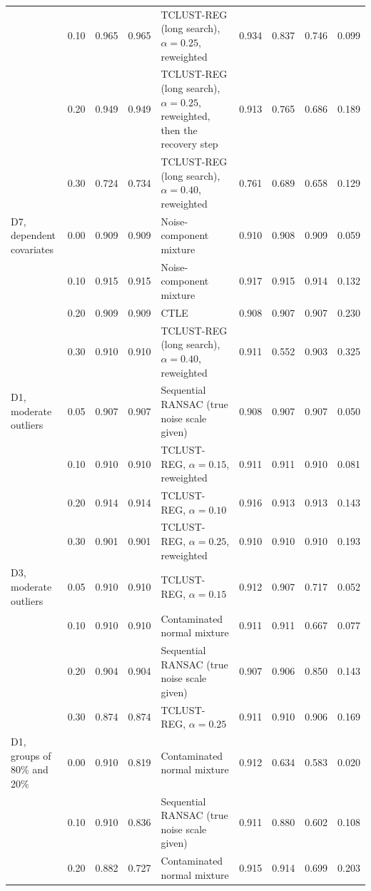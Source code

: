 \begin{table}[htbp]
{\begin{tabular}{lccclcccc}
 & 0.10 & 0.965 & 0.965 & TCLUST-REG (long search), $\alpha=0.25$, reweighted & 0.934 & 0.837 & 0.746 & 0.099 \\
 & 0.20 & 0.949 & 0.949 & TCLUST-REG (long search), $\alpha=0.25$, reweighted, then the recovery step & 0.913 & 0.765 & 0.686 & 0.189 \\
 & 0.30 & 0.724 & 0.734 & TCLUST-REG (long search), $\alpha=0.40$, reweighted & 0.761 & 0.689 & 0.658 & 0.129 \\
\addlinespace
D7, dependent covariates & 0.00 & 0.909 & 0.909 & Noise-component mixture & 0.910 & 0.908 & 0.909 & 0.059 \\
 & 0.10 & 0.915 & 0.915 & Noise-component mixture & 0.917 & 0.915 & 0.914 & 0.132 \\
 & 0.20 & 0.909 & 0.909 & CTLE & 0.908 & 0.907 & 0.907 & 0.230 \\
 & 0.30 & 0.910 & 0.910 & TCLUST-REG (long search), $\alpha=0.40$, reweighted & 0.911 & 0.552 & 0.903 & 0.325 \\
\addlinespace
D1, moderate outliers & 0.05 & 0.907 & 0.907 & Sequential RANSAC (true noise scale given) & 0.908 & 0.907 & 0.907 & 0.050 \\
 & 0.10 & 0.910 & 0.910 & TCLUST-REG, $\alpha=0.15$, reweighted & 0.911 & 0.911 & 0.910 & 0.081 \\
 & 0.20 & 0.914 & 0.914 & TCLUST-REG, $\alpha=0.10$ & 0.916 & 0.913 & 0.913 & 0.143 \\
 & 0.30 & 0.901 & 0.901 & TCLUST-REG, $\alpha=0.25$, reweighted & 0.910 & 0.910 & 0.910 & 0.193 \\
\addlinespace
D3, moderate outliers & 0.05 & 0.910 & 0.910 & TCLUST-REG, $\alpha=0.15$ & 0.912 & 0.907 & 0.717 & 0.052 \\
 & 0.10 & 0.910 & 0.910 & Contaminated normal mixture & 0.911 & 0.911 & 0.667 & 0.077 \\
 & 0.20 & 0.904 & 0.904 & Sequential RANSAC (true noise scale given) & 0.907 & 0.906 & 0.850 & 0.143 \\
 & 0.30 & 0.874 & 0.874 & TCLUST-REG, $\alpha=0.25$ & 0.911 & 0.910 & 0.906 & 0.169 \\
\addlinespace
D1, groups of 80\% and 20\% & 0.00 & 0.910 & 0.819 & Contaminated normal mixture & 0.912 & 0.634 & 0.583 & 0.020 \\
 & 0.10 & 0.910 & 0.836 & Sequential RANSAC (true noise scale given) & 0.911 & 0.880 & 0.602 & 0.108 \\
 & 0.20 & 0.882 & 0.727 & Contaminated normal mixture & 0.915 & 0.914 & 0.699 & 0.203 \\

\end{tabular}}
\end{table}
